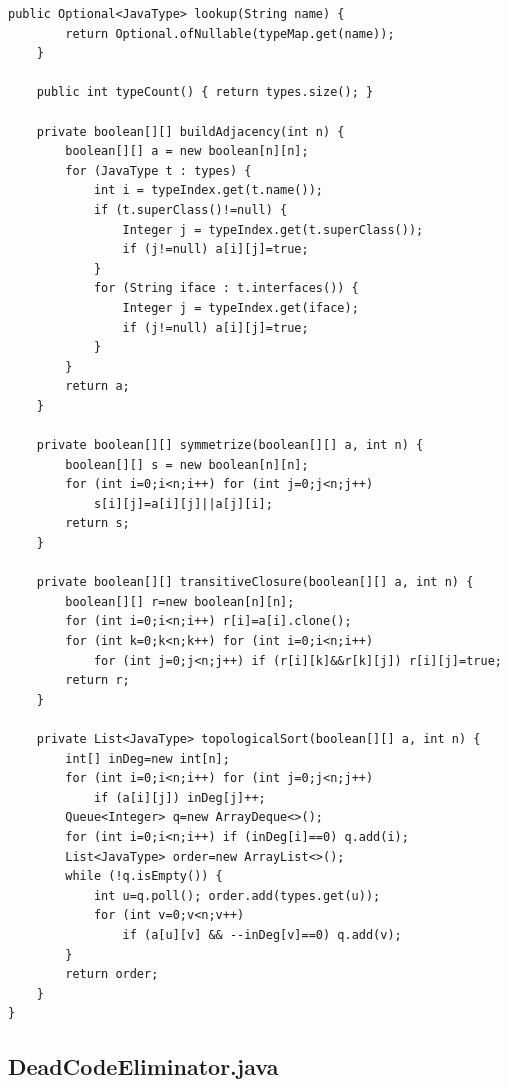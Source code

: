﻿\documentclass[a4paper,12pt]{article}
\theoremstyle{definition}
\begin{document}
\begin{lstlisting}[style=javastyle,
    caption={TypeResolver.java -- TAP via SI}]
    public Optional<JavaType> lookup(String name) {
        return Optional.ofNullable(typeMap.get(name));
    }

    public int typeCount() { return types.size(); }

    private boolean[][] buildAdjacency(int n) {
        boolean[][] a = new boolean[n][n];
        for (JavaType t : types) {
            int i = typeIndex.get(t.name());
            if (t.superClass()!=null) {
                Integer j = typeIndex.get(t.superClass());
                if (j!=null) a[i][j]=true;
            }
            for (String iface : t.interfaces()) {
                Integer j = typeIndex.get(iface);
                if (j!=null) a[i][j]=true;
            }
        }
        return a;
    }

    private boolean[][] symmetrize(boolean[][] a, int n) {
        boolean[][] s = new boolean[n][n];
        for (int i=0;i<n;i++) for (int j=0;j<n;j++)
            s[i][j]=a[i][j]||a[j][i];
        return s;
    }

    private boolean[][] transitiveClosure(boolean[][] a, int n) {
        boolean[][] r=new boolean[n][n];
        for (int i=0;i<n;i++) r[i]=a[i].clone();
        for (int k=0;k<n;k++) for (int i=0;i<n;i++)
            for (int j=0;j<n;j++) if (r[i][k]&&r[k][j]) r[i][j]=true;
        return r;
    }

    private List<JavaType> topologicalSort(boolean[][] a, int n) {
        int[] inDeg=new int[n];
        for (int i=0;i<n;i++) for (int j=0;j<n;j++)
            if (a[i][j]) inDeg[j]++;
        Queue<Integer> q=new ArrayDeque<>();
        for (int i=0;i<n;i++) if (inDeg[i]==0) q.add(i);
        List<JavaType> order=new ArrayList<>();
        while (!q.isEmpty()) {
            int u=q.poll(); order.add(types.get(u));
            for (int v=0;v<n;v++)
                if (a[u][v] && --inDeg[v]==0) q.add(v);
        }
        return order;
    }
}
\end{lstlisting}

\subsection{DeadCodeEliminator.java}
\end{document}
